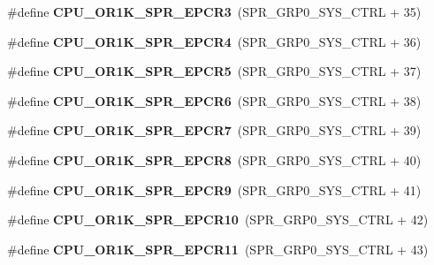 \begin{DoxyCompactItemize}
\#define {\bfseries C\+P\+U\+\_\+\+O\+R1\+K\+\_\+\+S\+P\+R\+\_\+\+E\+P\+C\+R3}~(S\+P\+R\+\_\+\+G\+R\+P0\+\_\+\+S\+Y\+S\+\_\+\+C\+T\+RL + 35)
\item 
\mbox{\label{or1k-utility_8h_a0105adc31fe44ed94c3afc55630f49fe}} 
\#define {\bfseries C\+P\+U\+\_\+\+O\+R1\+K\+\_\+\+S\+P\+R\+\_\+\+E\+P\+C\+R4}~(S\+P\+R\+\_\+\+G\+R\+P0\+\_\+\+S\+Y\+S\+\_\+\+C\+T\+RL + 36)
\item 
\mbox{\label{or1k-utility_8h_ab78b84fd13ac124efa7a91b77b7fbb8f}} 
\#define {\bfseries C\+P\+U\+\_\+\+O\+R1\+K\+\_\+\+S\+P\+R\+\_\+\+E\+P\+C\+R5}~(S\+P\+R\+\_\+\+G\+R\+P0\+\_\+\+S\+Y\+S\+\_\+\+C\+T\+RL + 37)
\item 
\mbox{\label{or1k-utility_8h_aa86d3b0befde86cd72ef577960722d6d}} 
\#define {\bfseries C\+P\+U\+\_\+\+O\+R1\+K\+\_\+\+S\+P\+R\+\_\+\+E\+P\+C\+R6}~(S\+P\+R\+\_\+\+G\+R\+P0\+\_\+\+S\+Y\+S\+\_\+\+C\+T\+RL + 38)
\item 
\mbox{\label{or1k-utility_8h_a28c8ef2ca25403c57a6c43fdf7faf25e}} 
\#define {\bfseries C\+P\+U\+\_\+\+O\+R1\+K\+\_\+\+S\+P\+R\+\_\+\+E\+P\+C\+R7}~(S\+P\+R\+\_\+\+G\+R\+P0\+\_\+\+S\+Y\+S\+\_\+\+C\+T\+RL + 39)
\item 
\mbox{\label{or1k-utility_8h_a2953d0dc27347bf062ecf5fa590abe29}} 
\#define {\bfseries C\+P\+U\+\_\+\+O\+R1\+K\+\_\+\+S\+P\+R\+\_\+\+E\+P\+C\+R8}~(S\+P\+R\+\_\+\+G\+R\+P0\+\_\+\+S\+Y\+S\+\_\+\+C\+T\+RL + 40)
\item 
\mbox{\label{or1k-utility_8h_a7cee236c08e339f27fb4d3d49e4fb6f3}} 
\#define {\bfseries C\+P\+U\+\_\+\+O\+R1\+K\+\_\+\+S\+P\+R\+\_\+\+E\+P\+C\+R9}~(S\+P\+R\+\_\+\+G\+R\+P0\+\_\+\+S\+Y\+S\+\_\+\+C\+T\+RL + 41)
\item 
\mbox{\label{or1k-utility_8h_a5318d74f52a023e66731c557f0cd2350}} 
\#define {\bfseries C\+P\+U\+\_\+\+O\+R1\+K\+\_\+\+S\+P\+R\+\_\+\+E\+P\+C\+R10}~(S\+P\+R\+\_\+\+G\+R\+P0\+\_\+\+S\+Y\+S\+\_\+\+C\+T\+RL + 42)
\item 
\mbox{\label{or1k-utility_8h_ad1bbb8fa6f8fd6bccd7161a5d8da2ffd}} 
\#define {\bfseries C\+P\+U\+\_\+\+O\+R1\+K\+\_\+\+S\+P\+R\+\_\+\+E\+P\+C\+R11}~(S\+P\+R\+\_\+\+G\+R\+P0\+\_\+\+S\+Y\+S\+\_\+\+C\+T\+RL + 43)

\end{DoxyCompactItemize}
